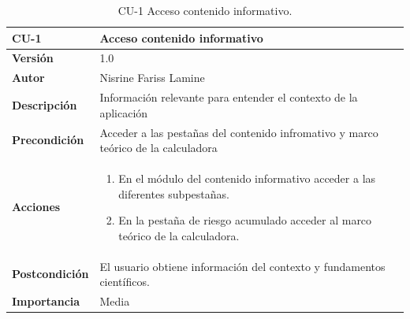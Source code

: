\begin{table}[p]
	\centering
	\begin{tabularx}{\linewidth}{ p{} p{} }
		\toprule
		\textbf{CU-1}    & \textbf{Acceso contenido informativo}\\
		\toprule
		\textbf{Versión}              & 1.0    \\
		\textbf{Autor}                & Nisrine Fariss Lamine \\
		
		\textbf{Descripción}          & Información relevante para entender el contexto de la aplicación \\
		\textbf{Precondición}         & Acceder a las pestañas del contenido infromativo y marco teórico de la calculadora \\
		\textbf{Acciones}             &
		\begin{enumerate}
			\def\labelenumi{\arabic{enumi}.}
			\tightlist
			\item En el módulo del contenido informativo acceder a las diferentes subpestañas.
			\item En la pestaña de riesgo acumulado acceder al marco teórico de la calculadora.
		\end{enumerate}\\
		\textbf{Postcondición}        & El usuario obtiene información del contexto y fundamentos científicos. \\
	
		\textbf{Importancia}          & Media \\
		\bottomrule
	\end{tabularx}
	\caption{CU-1 Acceso contenido informativo.}
\end{table}

